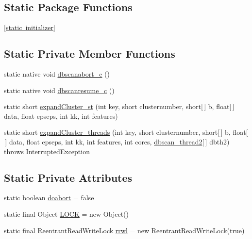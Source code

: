 \subsection*{Static Package Functions}
\begin{DoxyCompactItemize}
\item 
\mbox{\hyperlink{classcom_1_1example_1_1dmocl_1_1dbscan_aa4b840bbdc7c3cfb22a09e3dc521a4e1}{\mbox{[}static initializer\mbox{]}}}
\end{DoxyCompactItemize}
\subsection*{Static Private Member Functions}
\begin{DoxyCompactItemize}
\item 
static native void \mbox{\hyperlink{classcom_1_1example_1_1dmocl_1_1dbscan_a9046c500df8074b1f4f57d4cb0c274a8}{dbscanabort\+\_\+c}} ()
\item 
static native void \mbox{\hyperlink{classcom_1_1example_1_1dmocl_1_1dbscan_af20fc5d6d88472f6af230198246c9fe5}{dbscanresume\+\_\+c}} ()
\item 
static short \mbox{\hyperlink{classcom_1_1example_1_1dmocl_1_1dbscan_af18896a5db63c0bbb718611405ceb89f}{expand\+Cluster\+\_\+st}} (int key, short clusternumber, short\mbox{[}$\,$\mbox{]} b, float\mbox{[}$\,$\mbox{]} data, float epseps, int kk, int features)
\item 
static short \mbox{\hyperlink{classcom_1_1example_1_1dmocl_1_1dbscan_a86a06d7cd50e45df5f69d8bbf484a966}{expand\+Cluster\+\_\+threads}} (int key, short clusternumber, short\mbox{[}$\,$\mbox{]} b, float\mbox{[}$\,$\mbox{]} data, float epseps, int kk, int features, int cores, \mbox{\hyperlink{classcom_1_1example_1_1dmocl_1_1dbscan_1_1dbscan__thread2}{dbscan\+\_\+thread2}}\mbox{[}$\,$\mbox{]} dbth2)  throws Interrupted\+Exception  
\end{DoxyCompactItemize}
\subsection*{Static Private Attributes}
\begin{DoxyCompactItemize}
\item 
static boolean \mbox{\hyperlink{classcom_1_1example_1_1dmocl_1_1dbscan_a614b6e11c265a9291ad5e7b2a81e3524}{doabort}} = false
\item 
static final Object \mbox{\hyperlink{classcom_1_1example_1_1dmocl_1_1dbscan_ad1fe5e758b8545a61ec38b2329ffc96d}{L\+O\+CK}} = new Object()
\item 
static final Reentrant\+Read\+Write\+Lock \mbox{\hyperlink{classcom_1_1example_1_1dmocl_1_1dbscan_a1a5afc44bad3ba73e68b4a298e42beba}{rrwl}} = new Reentrant\+Read\+Write\+Lock(true)
\end{DoxyCompactItemize}


